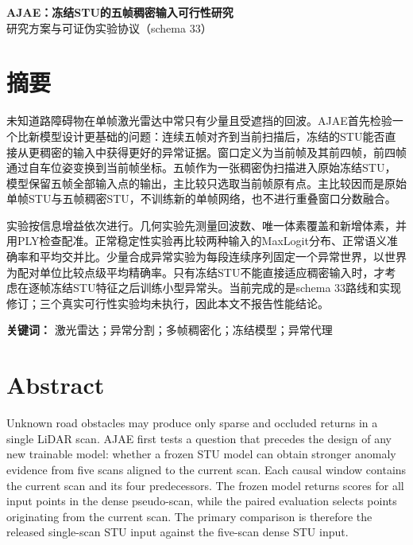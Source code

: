 \documentclass[UTF8,a4paper,zihao=5,fontset=none]{ctexart}
\begin{document}
\fontsize{9.5pt}{12.2pt}\selectfont

\begin{center}
  {\bfseries\fontsize{16pt}{20pt}\selectfont
  AJAE：冻结STU的五帧稠密输入可行性研究}\\[0.15em]
  {\fontsize{9.5pt}{12pt}\selectfont 研究方案与可证伪实验协议（schema 33）}
\end{center}

\section*{摘要}

未知道路障碍物在单帧激光雷达中常只有少量且受遮挡的回波。AJAE首先检验一个比新模型设计更基础的问题：连续五帧对齐到当前扫描后，冻结的STU能否直接从更稠密的输入中获得更好的异常证据。窗口定义为当前帧及其前四帧，前四帧通过自车位姿变换到当前帧坐标。五帧作为一张稠密伪扫描进入原始冻结STU，模型保留五帧全部输入点的输出，主比较只选取当前帧原有点。主比较因而是原始单帧STU与五帧稠密STU，不训练新的单帧网络，也不进行重叠窗口分数融合。

实验按信息增益依次进行。几何实验先测量回波数、唯一体素覆盖和新增体素，并用PLY检查配准。正常稳定性实验再比较两种输入的MaxLogit分布、正常语义准确率和平均交并比。少量合成异常实验为每段连续序列固定一个异常世界，以世界为配对单位比较点级平均精确率。只有冻结STU不能直接适应稠密输入时，才考虑在逐帧冻结STU特征之后训练小型异常头。当前完成的是schema 33路线和实现修订；三个真实可行性实验均未执行，因此本文不报告性能结论。

\noindent\textbf{关键词：} 激光雷达；异常分割；多帧稠密化；冻结模型；异常代理

\section*{Abstract}

Unknown road obstacles may produce only sparse and occluded returns in a single LiDAR scan. AJAE first tests a question that precedes the design of any new trainable model: whether a frozen STU model can obtain stronger anomaly evidence from five scans aligned to the current scan. Each causal window contains the current scan and its four predecessors. The frozen model returns scores for all input points in the dense pseudo-scan, while the paired evaluation selects points originating from the current scan. The primary comparison is therefore the released single-scan STU input against the five-scan dense STU input.
\end{document}

